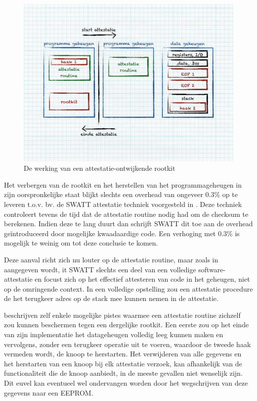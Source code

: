 \begin{figure}[ht]
  \centering
  \includegraphics[width=0.9\linewidth]{resources/attestation-rootkit.pdf}
  \caption{De werking van een attestatie-ontwijkende rootkit}
  \label{fig:attestation-rootkit}
\end{figure}

Het verbergen van de rootkit en het herstellen van het programmageheugen in
zijn oorspronkelijke staat blijkt slechts een overhead van ongeveer 0.3\% op te
leveren t.o.v. bv. de SWATT attestatie techniek voorgesteld in
\citep{seshadri2004swatt}. Deze techniek controleert tevens de tijd dat de
attestatie routine nodig had om de checksum te berekenen. Indien deze te lang
duurt dan schrijft SWATT dit toe aan de overhead ge\"introduceerd door
mogelijke kwaadaardige code. Een verhoging met 0.3\% is mogelijk te weinig om
tot deze conclusie te komen.

Deze aanval richt zich nu louter op de attestatie routine, maar zoals in
\citep{perrig2010refutation} aangegeven wordt, it SWATT slechts een deel van een
volledige software-attestatie en focust zich op het effectief attesteren van
code in het geheugen, niet op de omringende context. In een volledige
opstelling zou een attestatie procedure de het terugkeer adres op de stack mee
kunnen nemen in de attestatie.

\citep{castelluccia2009difficulty} beschrijven zelf enkele mogelijke pistes
waarmee een attestatie routine zichzelf zou kunnen beschermen tegen een
dergelijke rootkit. Een eerste zou op het einde van zijn implementatie het datageheugen volledig leeg kunnen maken en vervolgens, zonder een terugkeer
operatie uit te voeren, waardoor de tweede haak vermeden wordt, de knoop te
herstarten. Het verwijderen van alle gegevens en het herstarten van een knoop
bij elk attestatie verzoek, kan afhankelijk van de functionaliteit die de knoop
aanbiedt, in de meeste gevallen niet wenselijk zijn. Dit euvel kan eventueel
wel ondervangen worden door het wegschrijven van deze gegevens naar een EEPROM.

